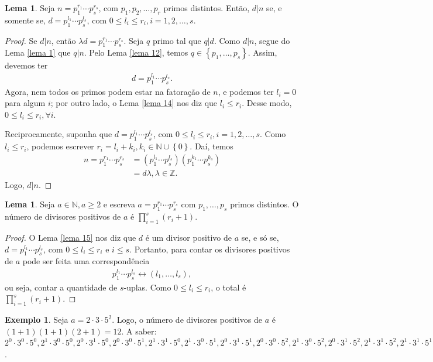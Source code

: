 \documentclass[a4paper,11pt,twoside, leqno]{article}
\theoremstyle{definition}
\newtheorem{lemma}[theorem]{Lema}
\newtheorem*{example}{Exemplo}
\begin{document}
\begin{lemma}
	\label{lema 15}
	Seja $n = p_1^{r_1}\cdots p_s^{r_s}$, com $p_1, p_2, \dots, p_r$ primos distintos. Então, $d|n$ se, e somente se, $d = p_1^{l_1}\cdots p_s^{l_s}$, com $0\leq l_i\leq r_i, i = 1, 2, \dots, s$.
\end{lemma}
\begin{proof}
	Se $d|n$, então $\lambda d = p_1^{r_1}\cdots p_s^{r_s}$. Seja $q$ primo tal que $q|d$. Como $d|n$, segue do Lema \eqref{lema 1} que $q|n$. Pelo Lema \eqref{lema 12}, temos $q\in\left\{p_1, \dots, p_s\right\}$. Assim, devemos ter 
	\begin{align*}
	d = p_1^{l_1}\cdots p_s^{l_s}.
	\end{align*}
	Agora, nem todos os primos podem estar na fatoração de $n$, e podemos ter $l_i = 0$ para algum $i$; por outro lado, o Lema \eqref{lema 14} nos diz que $l_i\leq r_i$. Desse modo, $0\leq l_i\leq r_i, \forall i$.
	
	Reciprocamente, suponha que $d = p_1^{l_1}\cdots p_s^{l_s}$, com $0\leq l_i\leq r_i, i = 1,2,\dots,s$. Como $l_i\leq r_i$, podemos escrever $r_i = l_i + k_i, k_i\in\mathbb{N}\cup\left\{0\right\}$. Daí, temos
	\begin{align*}
	n = p_1^{r_1}\cdots p_s^{r_s} &= \left( p_1^{l_1}\cdots p_s^{l_s} \right)\left( p_1^{k_1}\cdots p_s^{k_s} \right) \\
	&= d\lambda, \lambda\in\mathbb{Z}.
	\end{align*}
	Logo, $d|n$.
\end{proof}
\begin{lemma}
	\label{lema 16}
	Seja $a\in\mathbb{N}, a\geq 2$ e escreva $a = p_1^{r_1}\cdots p_s^{r_s}$ com $p_1, \dots, p_s$ primos distintos. O número de divisores positivos de $a$ é $\displaystyle{\prod_{i=1}^{s}(r_i+1)}$.
\end{lemma}
\begin{proof}
	O Lema \eqref{lema 15} nos diz que $d$ é um divisor positivo de $a$ se, e só se, $d = p_1^{l_1}\cdots p_s^{l_s}$, com $0\leq l_i\leq r_i$ e $i\leq s$. Portanto, para contar os divisores positivos de $a$ pode ser feita uma correspondência
	\begin{align*}
	p_1^{l_1}\cdots p_s^{l_s} \leftrightarrow (l_1, \dots, l_s),
	\end{align*}
	ou seja, contar a quantidade de $s$-uplas. Como $0\leq l_i\leq r_i$, o total é $\displaystyle{ \prod_{i=1}^{s}(r_i + 1) }$.
\end{proof}
\begin{example}
	Seja $a = 2\cdot 3\cdot 5^2$. Logo, o número de divisores positivos de $a$ é $(1+1)(1+1)(2+1) = 12$. A saber: $2^0\cdot 3^0\cdot 5^0, 2^1\cdot 3^0\cdot 5^0, 2^0\cdot 3^1\cdot 5^0, 2^0\cdot 3^0\cdot 5^1, 2^1\cdot 3^1\cdot 5^0, 2^1\cdot 3^0\cdot 5^1, 2^0\cdot 3^1\cdot 5^1, 2^0\cdot 3^0\cdot 5^2, 2^1\cdot 3^0\cdot 5^2, 2^0\cdot 3^1\cdot 5^2, 2^1\cdot 3^1\cdot 5^2, 2^1\cdot 3^1\cdot 5^1$.
\end{example}
\end{document}
